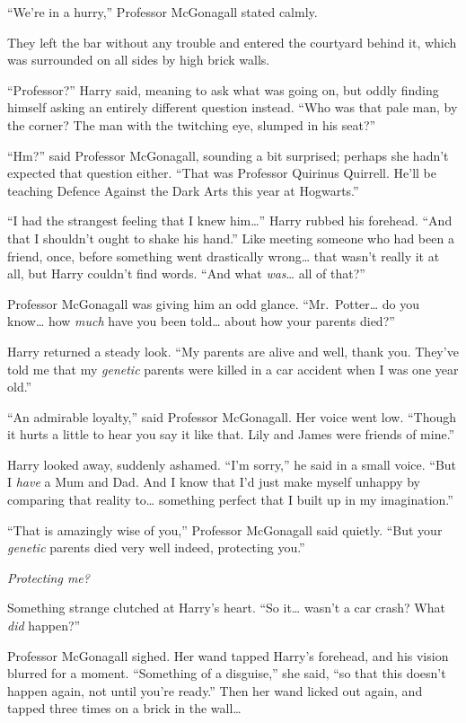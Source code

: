 “We’re in a hurry,” Professor McGonagall stated calmly.

They left the bar without any trouble and entered the courtyard
behind it, which was surrounded on all sides by high brick walls.

“Professor?” Harry said, meaning to ask what was going on, but oddly
finding himself asking an entirely different question instead.
“Who was that pale man, by the corner? The man with
the twitching eye, slumped in his seat?”

“Hm?” said Professor McGonagall, sounding a bit surprised; perhaps she hadn’t
expected that question either. “That was Professor Quirinus Quirrell. He’ll be
teaching Defence Against the Dark Arts this year at Hogwarts.”

“I had the strangest feeling that I knew him…” Harry rubbed his
forehead. “And that I shouldn’t ought to shake his hand.” Like meeting someone
who had been a friend, once, before something went drastically wrong…
that wasn’t really it at all, but Harry couldn’t find words. “And what
\emph{was}… all of that?”

Professor McGonagall was giving him an odd glance. “Mr.~Potter… do you
know… how \emph{much} have you been told… about how your parents
died?”

Harry returned a steady look. “My parents are alive and
well, thank you. They’ve told me that my \emph{genetic} parents
were killed in a car accident when I was one year old.”

“An admirable loyalty,” said Professor McGonagall. Her voice went low. “Though
it hurts a little to hear you say it like that. Lily and James were friends of
mine.”

Harry looked away, suddenly ashamed. “I’m sorry,” he said in a small voice.
“But I \emph{have} a Mum and Dad. And I know that I’d just make myself unhappy
by comparing that reality to… something perfect that I built up in my
imagination.”

“That is amazingly wise of you,” Professor McGonagall said quietly. “But your
\emph{genetic} parents died very well indeed, protecting you.”

\emph{Protecting me?}

Something strange clutched at Harry’s heart. “So it…
wasn’t a car crash? What \emph{did} happen?”

Professor McGonagall sighed. Her wand tapped Harry’s forehead, and his vision
blurred for a moment. “Something of a disguise,” she said, “so that this
doesn’t happen again, not until you’re ready.” Then her wand licked out again,
and tapped three times on a brick in the wall…

